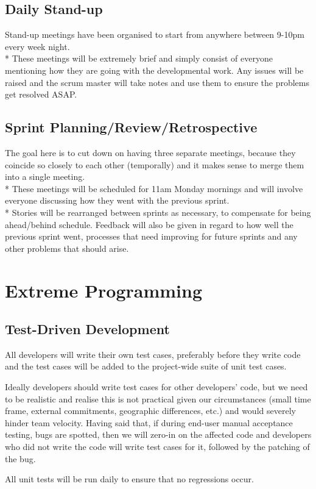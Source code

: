\documentclass[12pt,titlepage]{article}
\begin{document}
\subsection{Daily Stand-up}
Stand-up meetings have been organised to start from anywhere between 9-10pm every
week night. \\*
These meetings will be extremely brief and simply consist of everyone mentioning
how they are going with the developmental work. Any issues will be raised and
the scrum master will take notes and use them to ensure the problems get
resolved ASAP.

\subsection{Sprint Planning/Review/Retrospective}
The goal here is to cut down on having three separate meetings, because they
coincide so closely to each other (temporally) and it makes sense to merge them
into a single meeting. \\*
These meetings will be scheduled for 11am Monday mornings and will involve
everyone discussing how they went with the previous sprint. \\*
Stories will be rearranged between sprints as necessary, to compensate for being
ahead/behind schedule. Feedback will also be given in regard to how well the
previous sprint went, processes that need improving for future sprints and any
other problems that should arise.

\section{Extreme Programming}

\subsection{Test-Driven Development}
All developers will write their own test cases, preferably before they write
code and the test cases will be added to the project-wide suite of unit test
cases.

Ideally developers should write test cases for other developers' code, but we
need to be realistic and realise this is not practical given our circumstances
(small time frame, external commitments, geographic differences, etc.) and would
severely hinder team velocity. Having said that, if during end-user manual
acceptance testing, bugs are spotted, then we will zero-in on the affected code
and developers who did not write the code will write test cases for it, followed
by the patching of the bug.

All unit tests will be run daily to ensure that no regressions occur.
\end{document}
